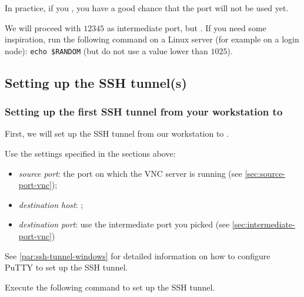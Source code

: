 In practice, if you , you have a good chance that the
port will not be used yet.

We will proceed with $12345$ as intermediate port, but . If you need some inspiration, run the following command on a Linux server
(for example on a login node): \texttt{echo \$RANDOM} (but do not use a value lower than $1025$).

\subsection{Setting up the SSH tunnel(s)}
\label{sec:ssh-tunnel-vnc}

\subsubsection{Setting up the first SSH tunnel from your workstation to \loginnode}

First, we will set up the SSH tunnel from our workstation to \loginnode.

Use the settings specified in the sections above:

\begin{itemize}
\item \emph{source port}: the port on which the VNC server is running (see \autoref{sec:source-port-vnc});
\item \emph{destination host}: \texttt{\loginnode{}};
\item \emph{destination port}: use the intermediate port you picked (see \autoref{sec:intermediate-port-vnc})
\end{itemize}

\ifwindows

See \autoref{par:ssh-tunnel-windows} for detailed information on how to configure PuTTY to set up the SSH tunnel.

\else

Execute the following command to set up the SSH tunnel.\\

\begin{prompt}
\end{prompt}


